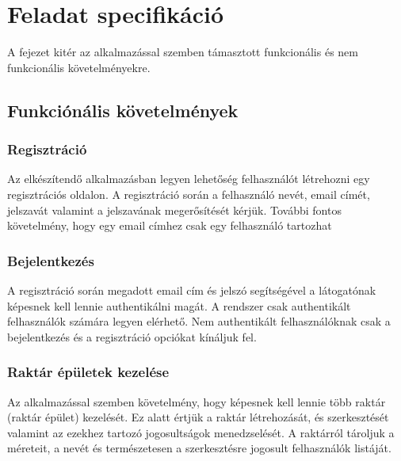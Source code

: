 \chapter{Feladat specifikáció}

A fejezet kitér az alkalmazással szemben támasztott funkcionális és nem funkcionális követelményekre.

\section{Funkciónális követelmények}

\subsection{Regisztráció}
Az elkészítendő alkalmazásban legyen lehetőség felhasználót létrehozni egy regisztrációs oldalon.
A regisztráció során a felhasználó nevét, email címét, jelszavát valamint a jelszavának megerősítését kérjük.
További fontos követelmény, hogy egy email címhez csak egy felhasználó tartozhat

\subsection{Bejelentkezés}
A regisztráció során megadott email cím és jelszó segítségével a látogatónak képesnek kell lennie authentikálni magát.
A rendszer csak authentikált felhasználók számára legyen elérhető.
Nem authentikált felhasználóknak csak a bejelentkezés és a regisztráció opciókat kínáljuk fel.

\subsection{Raktár épületek kezelése}
Az alkalmazással szemben követelmény, hogy képesnek kell lennie több raktár (raktár épület) kezelését.
Ez alatt értjük a raktár létrehozását, és szerkesztését valamint az ezekhez tartozó jogosultságok menedzselését.
A raktárról tároljuk a méreteit, a nevét és természetesen a szerkesztésre jogosult felhasználók listáját.

